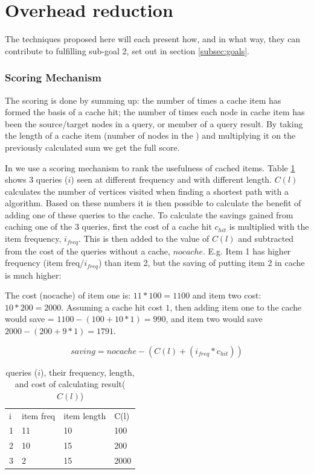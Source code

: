 \section{Overhead reduction}
The techniques proposed here will each present how, and in what way, they can contribute to fulfilling sub-goal 2, set out in section \ref{subsec:goals}.

\subsubsection{Scoring Mechanism}


The scoring is done by summing up: the number of times a cache item has formed the basis of a cache hit; the number of times each node in cache item has been the source/target nodes in a query, or member of a query result. By taking the length of a cache item (number of nodes in the \spath) and multiplying it on the previously calculated sum we get the full score.

In \osc we use a scoring mechanism to rank the usefulness of cached items. Table \ref{tab:score} shows 3 queries ($i$) seen at different frequency and with different length. $C(l)$ calculates the number of vertices visited when finding a shortest path with a \spath algorithm. Based on these numbers it is then possible to calculate the benefit of adding one of these \spath queries to the cache. To calculate the savings gained from caching one of the 3 queries, first the cost of a cache hit $c_{hit}$ is multiplied with the item frequency, $i_{freq}$. This is then added to the value of $C(l)$ and subtracted from the cost of the queries without a cache, $nocache$. E.g. Item 1 has higher frequency (item freq/$i_{freq}$) than item 2, but the saving of putting item 2 in cache is much higher:

The cost (nocache) of item one is: $11*100=1100$ and item two cost: $10*200=2000$. Assuming a cache hit cost $1$, then adding item one to the cache would save = $1100-(100+10*1)=990$, and item two would save $2000-(200+9*1)=1791$. 

\begin{equation}\label{eq:cachesaving}
saving = nocache - (C(l) + (i_{freq} * c_{hit}))
\end{equation}


\begin{table}
\begin{center}
\begin{tabular}{l |l |l |l}
i & item freq & item length & C(l) \\
1 & 11 & 10 & 100 \\
2 & 10 & 15 & 200 \\
3 & 2 & 15 & 2000 \\
\end{tabular}
\end{center}
\caption{\spath queries ($i$), their frequency, length, and cost of calculating result($C(l)$)}
\label{tab:score}
\end{table}


